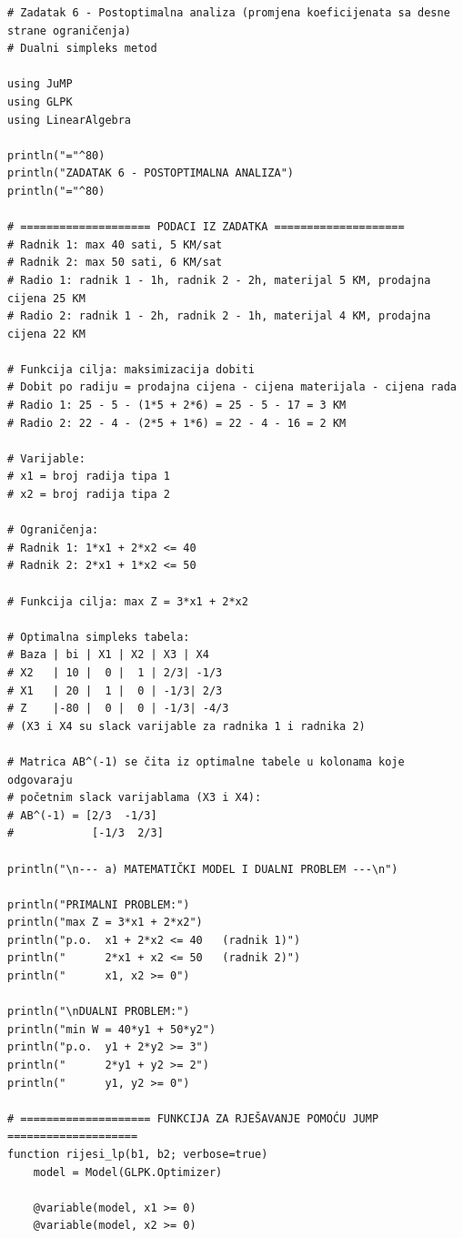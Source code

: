\documentclass[12pt,a4paper]{article}
\begin{document}
\begin{lstlisting}[style=julia, caption={Julia kod za postoptimalnu analizu}]
# Zadatak 6 - Postoptimalna analiza (promjena koeficijenata sa desne strane ograničenja)
# Dualni simpleks metod

using JuMP
using GLPK
using LinearAlgebra

println("="^80)
println("ZADATAK 6 - POSTOPTIMALNA ANALIZA")
println("="^80)

# ==================== PODACI IZ ZADATKA ====================
# Radnik 1: max 40 sati, 5 KM/sat
# Radnik 2: max 50 sati, 6 KM/sat
# Radio 1: radnik 1 - 1h, radnik 2 - 2h, materijal 5 KM, prodajna cijena 25 KM
# Radio 2: radnik 1 - 2h, radnik 2 - 1h, materijal 4 KM, prodajna cijena 22 KM

# Funkcija cilja: maksimizacija dobiti
# Dobit po radiju = prodajna cijena - cijena materijala - cijena rada
# Radio 1: 25 - 5 - (1*5 + 2*6) = 25 - 5 - 17 = 3 KM
# Radio 2: 22 - 4 - (2*5 + 1*6) = 22 - 4 - 16 = 2 KM

# Varijable:
# x1 = broj radija tipa 1
# x2 = broj radija tipa 2

# Ograničenja:
# Radnik 1: 1*x1 + 2*x2 <= 40
# Radnik 2: 2*x1 + 1*x2 <= 50

# Funkcija cilja: max Z = 3*x1 + 2*x2

# Optimalna simpleks tabela:
# Baza | bi | X1 | X2 | X3 | X4
# X2   | 10 |  0 |  1 | 2/3| -1/3
# X1   | 20 |  1 |  0 | -1/3| 2/3
# Z    |-80 |  0 |  0 | -1/3| -4/3
# (X3 i X4 su slack varijable za radnika 1 i radnika 2)

# Matrica AB^(-1) se čita iz optimalne tabele u kolonama koje odgovaraju
# početnim slack varijablama (X3 i X4):
# AB^(-1) = [2/3  -1/3]
#            [-1/3  2/3]

println("\n--- a) MATEMATIČKI MODEL I DUALNI PROBLEM ---\n")

println("PRIMALNI PROBLEM:")
println("max Z = 3*x1 + 2*x2")
println("p.o.  x1 + 2*x2 <= 40   (radnik 1)")
println("      2*x1 + x2 <= 50   (radnik 2)")
println("      x1, x2 >= 0")

println("\nDUALNI PROBLEM:")
println("min W = 40*y1 + 50*y2")
println("p.o.  y1 + 2*y2 >= 3")
println("      2*y1 + y2 >= 2")
println("      y1, y2 >= 0")

# ==================== FUNKCIJA ZA RJEŠAVANJE POMOĆU JUMP ====================
function rijesi_lp(b1, b2; verbose=true)
    model = Model(GLPK.Optimizer)
    
    @variable(model, x1 >= 0)
    @variable(model, x2 >= 0)
    

\end{lstlisting}
\end{document}

